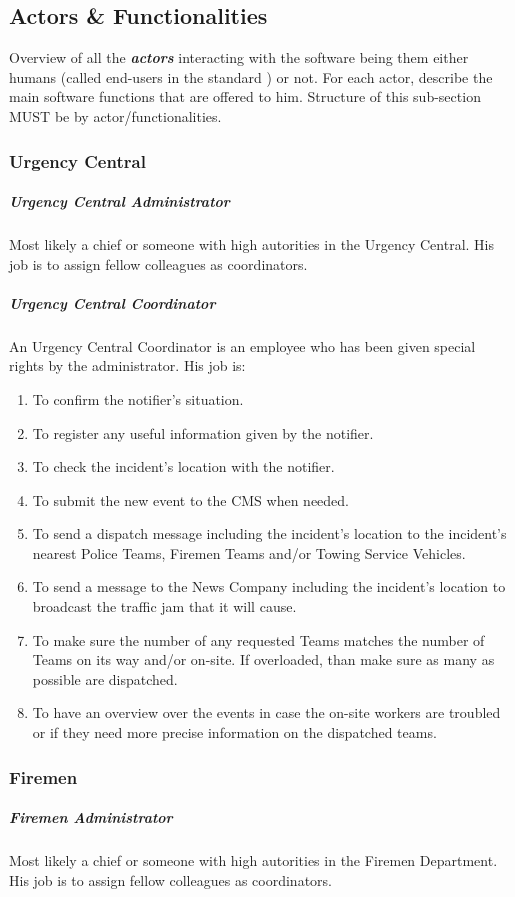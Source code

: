 \subsection{Actors \& Functionalities}
Overview of all the \textbf{\emph{\glspl{actor}}} interacting with the software
being them either humans (called end-users in the standard
\cite{IEEE-2001-userdocumentation}) or not. For each actor, describe the main
software functions that are offered to him. Structure of this sub-section MUST
be by actor/functionalities.



\subsubsection{Urgency Central}
\subparagraph{Urgency Central Administrator}
Most likely a chief or someone with high autorities in the Urgency Central. His
job is to assign fellow colleagues as coordinators.

\subparagraph{Urgency Central Coordinator}
An Urgency Central Coordinator is an employee who has been given special rights
by the administrator. His job is:

\begin{enumerate}
\item To confirm the notifier's situation.
\item To register any useful information given by the notifier.
\item To check the incident's location with the notifier.
\item To submit the new event to the CMS when needed.
\item To send a dispatch message including the incident's location to the
incident's nearest Police Teams, Firemen Teams and/or Towing Service Vehicles.
\item To send a message to the News Company including the incident's location to
broadcast the traffic jam that it will cause.
\item To make sure the number of any requested Teams matches the number of Teams
on its way and/or on-site. If overloaded, than make sure as many as possible are
dispatched.
\item To have an overview over the events in case the on-site workers are
troubled or if they need more precise information on the dispatched teams.
\end{enumerate}



\subsubsection{Firemen}
\subparagraph{Firemen Administrator}
Most likely a chief or someone with high autorities in the Firemen Department.
His job is to assign fellow colleagues as coordinators.


